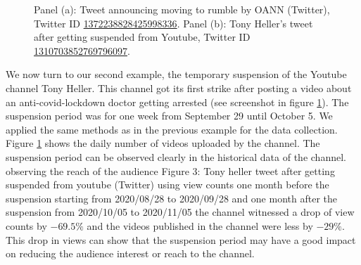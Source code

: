 \documentclass[11pt,a4paper]{article}
\begin{document}
\begin{figure}
	\caption{Panel (a): Tweet announcing moving to rumble by OANN (Twitter), Twitter ID \href{https://twitter.com/OANN/status/1372238828425998336}{1372238828425998336}. Panel (b): Tony Heller's tweet after getting suspended from Youtube, Twitter ID \href{https://twitter.com/Tony\_Heller/status/1310703852769796097}{1310703852769796097}.}
	\label{fig2_oann}
\end{figure}

\smallskip


We now turn to our second example, the temporary suspension of the Youtube channel Tony Heller. This channel got its first strike after posting a video about an anti-covid-lockdown doctor getting arrested (see screenshot in figure \ref{fig2_oann}). The suspension period was for one week from September 29 until October 5. We applied the same methods as in the previous example for the data collection. Figure \ref{fig2_oann} shows the daily number of videos uploaded by the channel. The suspension period can be observed clearly in the historical data of the channel.  observing the reach of the audience 
Figure 3: Tony heller tweet after getting suspended from youtube (Twitter)
using view counts one month before the suspension starting from 2020/08/28 to 2020/09/28 and one month after the suspension from 2020/10/05 to 2020/11/05 the channel witnessed a drop of view counts by $-69.5\%$ and the videos published in the channel were less by $-29\%$. This drop in views can show that the  suspension  period
may  have  a  good  impact  on  reducing  the  audience interest or reach to the channel.
\end{document}
